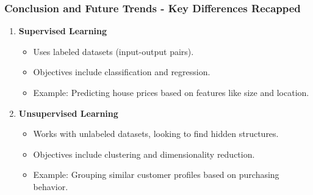 \documentclass{beamer}
\begin{document}
\begin{frame}[fragile]
    \frametitle{Conclusion and Future Trends - Key Differences Recapped}
    \begin{enumerate}
        \item \textbf{Supervised Learning}
        \begin{itemize}
            \item Uses labeled datasets (input-output pairs).
            \item Objectives include classification and regression.
            \item Example: Predicting house prices based on features like size and location.
        \end{itemize}
        \item \textbf{Unsupervised Learning}
        \begin{itemize}
            \item Works with unlabeled datasets, looking to find hidden structures.
            \item Objectives include clustering and dimensionality reduction.
            \item Example: Grouping similar customer profiles based on purchasing behavior.
        \end{itemize}
    \end{enumerate}
\end{frame}
\end{document}
